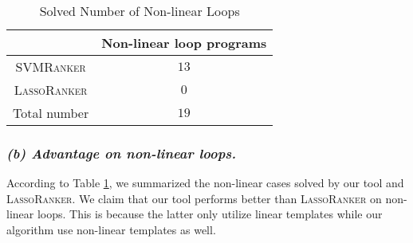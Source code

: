 \documentclass[UTF-8]{article}
\begin{document}
\begin{table}
\centering
\begin{tabular}{c|c}
& Non-linear loop programs \\
\hline
\textsc{SVMRanker} & $13$\\
\textsc{LassoRanker} & $0$\\
\hline
Total number & $19$  \\
\end{tabular}
\caption{Solved Number of Non-linear Loops}
\label{advantage_table}
\end{table}

\subsubsection{\textit{(b) Advantage on non-linear loops.}}
According to Table \ref{advantage_table}, we summarized the non-linear cases solved by our tool and \textsc{LassoRanker}. We claim that our tool performs better than \textsc{LassoRanker} on non-linear loops. This is because the latter only utilize linear templates while our algorithm use non-linear templates as well.
\end{document}
